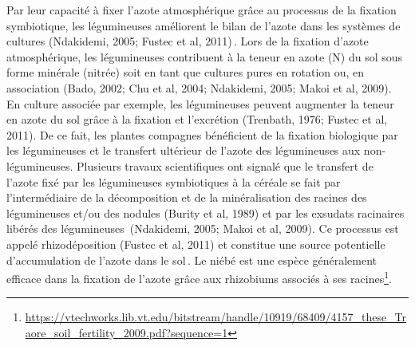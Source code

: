 \documentclass[a4paper,11pt]{article}
\begin{document}
Par leur capacité à fixer l’azote atmosphérique grâce au processus de
la fixation symbiotique, les légumineuses améliorent le bilan de
l'azote dans les systèmes de cultures (Ndakidemi, 2005; Fustec et al,
2011)\,\cite{Ndakidemi_2005}. Lors de la fixation d’azote atmosphérique, les légumineuses
contribuent à la teneur en azote (N) du sol sous forme minérale
(nitrée) soit en tant que cultures pures en rotation ou, en
association (Bado, 2002; Chu et al, 2004; Ndakidemi, 2005; Makoi et
al, 2009). En culture associée par exemple, les légumineuses peuvent
augmenter la teneur en azote du sol grâce à la fixation et l’excrétion
(Trenbath, 1976; Fustec et al, 2011). De ce fait, les plantes
compagnes bénéficient de la fixation biologique par les légumineuses
et le transfert ultérieur de l’azote des légumineuses aux
non-légumineuses. Plusieurs travaux scientifiques ont signalé que le
transfert de l’azote fixé par les légumineuses symbiotiques à la
céréale se fait par l’intermédiaire de la décomposition et de la
minéralisation des racines des légumineuses et/ou des nodules (Burity
et al, 1989) et par les exsudats racinaires libérés des légumineuses\,
\cite{Ndakidemi_2005} (Ndakidemi, 2005; Makoi et al, 2009).
Ce processus est appelé rhizodéposition (Fustec et al, 2011) et constitue
une source potentielle d’accumulation de l’azote dans le
sol\,\cite{Koulibi_FideleZONGO}. Le niébé est une espèce généralement
efficace dans la fixation de l’azote grâce aux rhizobiums associés à
ses racines\footnote{\url{https://vtechworks.lib.vt.edu/bitstream/handle/10919/68409/4157_these_Traore_soil_fertility_2009.pdf?sequence=1}}.

\newpage

 
  
\end{document}
